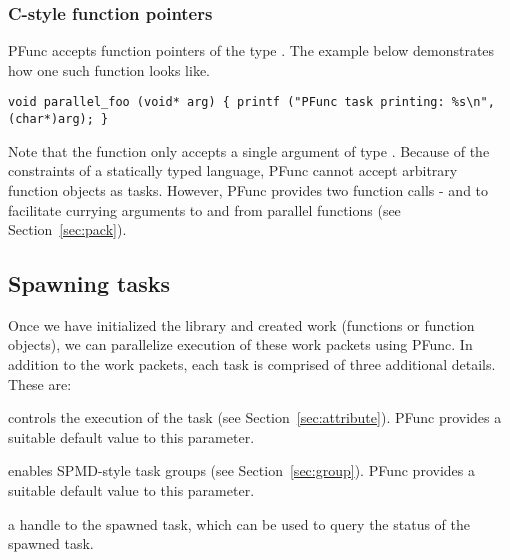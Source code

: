 \subsubsection{C-style function pointers}
PFunc accepts function pointers of the type . The
example below demonstrates how one such function looks like.

\begin{lstlisting}
void parallel_foo (void* arg) { printf ("PFunc task printing: %s\n", (char*)arg); }
\end{lstlisting}

Note that the function only accepts a single argument of type .
Because of the constraints of a statically typed language, PFunc cannot accept
arbitrary function objects as tasks.  However, PFunc provides two function
calls -  and  to facilitate currying
arguments to and from parallel functions (see Section~\ref{sec:pack}).

\subsection{Spawning tasks}
Once we have initialized the library and created work (functions or function
objects), we can parallelize execution of these work packets using PFunc. 
%
In addition to the work packets, each task is comprised of three additional
details. These are:

\begin{list}{}{\leftmargin=0em}
\item {} controls the execution of the task (see
Section~\ref{sec:attribute}).  PFunc provides a suitable default value to this
parameter.
\item {} enables SPMD-style task groups (see
Section~\ref{sec:group}).  PFunc provides a suitable default value to this
parameter.
\item {} a handle to the spawned task, which can be used to query the
status of the spawned task.
\end{list}

